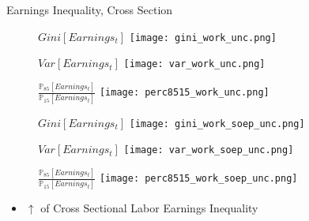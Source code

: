 \documentclass{beamer}
\begin{document}
\begin{frame}{Earnings Inequality, Cross Section}
\begin{figure}[!t]
\centering
\begin{minipage}[b]{0.32\textwidth}{$Gini[Earnings_t]$}
\centering
\texttt{[image: gini\_work\_unc.png]}
\end{minipage}
\begin{minipage}[b]{0.32\textwidth}{$Var[Earnings_t]$}
\centering
\texttt{[image: var\_work\_unc.png]}
\end{minipage}
\begin{minipage}[b]{0.32\textwidth}{$\frac{\mathbb{P}_{85}[Earnings_t]}{\mathbb{P}_{15}[Earnings_t]}$}
\centering
\texttt{[image: perc8515\_work\_unc.png]}
\end{minipage}
\end{figure}
\begin{figure}[!t]
\centering
\begin{minipage}[b]{0.32\textwidth}{$Gini[Earnings_t]$}
\centering
\texttt{[image: gini\_work\_soep\_unc.png]}
\end{minipage}
\begin{minipage}[b]{0.32\textwidth}{$Var[Earnings_t]$}
\centering
\texttt{[image: var\_work\_soep\_unc.png]}
\end{minipage}
\begin{minipage}[b]{0.32\textwidth}{$\frac{\mathbb{P}_{85}[Earnings_t]}{\mathbb{P}_{15}[Earnings_t]}$}
\centering
\texttt{[image: perc8515\_work\_soep\_unc.png]}
\end{minipage}
\end{figure}
\begin{itemize}
\setlength{\itemsep}{0.7 cm}
\item $\uparrow$ of Cross Sectional Labor Earnings Inequality
\end{itemize}
\end{frame}
\end{document}
